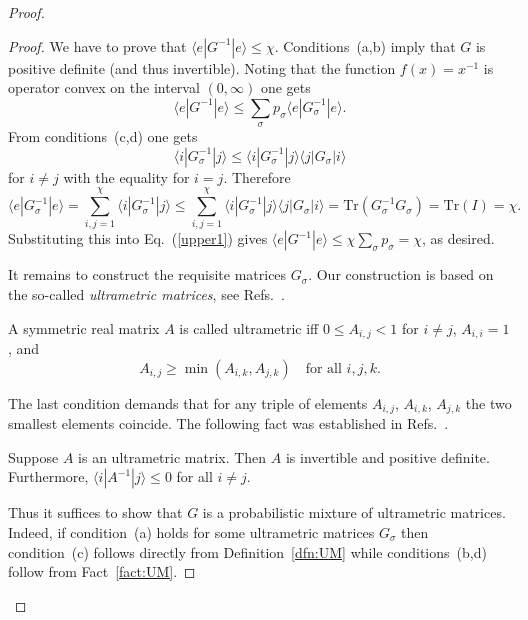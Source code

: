 \begin{proof}
\begin{proof}
We have to prove that $\langle e|G^{-1}|e\rangle\le \chi$.
Conditions~(a,b) imply that  $G$ is positive definite (and thus invertible). 
Noting that  the function $f(x)=x^{-1}$ is operator convex on the interval $(0,\infty)$
one gets 
\begin{equation}
\label{upper1}
\langle e|G^{-1}|e\rangle \le \sum_\sigma p_\sigma \langle e|G_\sigma^{-1} |e\rangle.
\end{equation}
From conditions~(c,d) one gets
\[
\langle i|G^{-1}_\sigma|j\rangle \le \langle i|G^{-1}_\sigma|j\rangle \langle j|G_\sigma|i\rangle
\]
for $i\ne j$ with the equality for $i=j$. 
Therefore 
\begin{equation}
\label{upper2}
\langle e|G^{-1}_\sigma|e\rangle = \sum_{i,j=1}^\chi \langle i| G^{-1}_\sigma|j\rangle 
\le \sum_{i,j=1}^\chi \langle i| G^{-1}_\sigma|j\rangle  \langle j| G_\sigma|i\rangle  = \mbox{Tr}(G^{-1}_\sigma G_\sigma) =
\mbox{Tr}(I)= \chi.
\end{equation}
Substituting this into Eq.~(\ref{upper1}) gives $\langle e|G^{-1}|e\rangle\le \chi \sum_\sigma p_\sigma =\chi$,
as desired.

It remains to construct the requisite matrices $G_\sigma$.
Our construction is based on the so-called  {\em ultrametric matrices},
see Refs.~\cite{MMM,NabenVarga}.
\begin{dfn}
\label{dfn:UM}
A symmetric real matrix $A$ is called  ultrametric iff
$0\le A_{i,j}<1$ for $i\ne j$,  $A_{i,i}=1$, and 
\begin{equation}
\label{UM1}
A_{i,j} \ge \min{(A_{i,k}, A_{j,k})}
\quad \mbox{for all $i,j,k$}.
\end{equation}
\end{dfn}
The last condition demands that for any triple of elements $A_{i,j}$, $A_{i,k}$, $A_{j,k}$  the two smallest 
elements coincide. 
The following fact was established in Refs.~\cite{MMM,NabenVarga}.
\begin{fact}
\label{fact:UM}
Suppose $A$ is an ultrametric matrix. Then $A$ is invertible and 
positive definite. Furthermore,  $\langle i| A^{-1}|j\rangle \le 0$ for all $i\ne j$.
\end{fact}
Thus it suffices to show that $G$ is a probabilistic mixture of ultrametric matrices.
Indeed, if condition~(a) holds for some ultrametric matrices $G_\sigma$ then 
condition~(c) follows directly from Definition~\ref{dfn:UM}
while conditions~(b,d) follow from Fact~\ref{fact:UM}.


\end{proof}
\end{proof}
